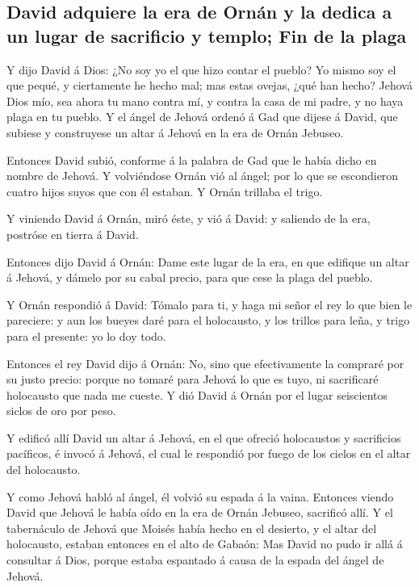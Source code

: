 \hypertarget{david-adquiere-la-era-de-ornuxe1n-y-la-dedica-a-un-lugar-de-sacrificio-y-templo-fin-de-la-plaga}{%
\subsection{David adquiere la era de Ornán y la dedica a un lugar de
sacrificio y templo; Fin de la
plaga}\label{david-adquiere-la-era-de-ornuxe1n-y-la-dedica-a-un-lugar-de-sacrificio-y-templo-fin-de-la-plaga}}

 Y dijo David á Dios: ¿No soy yo el que hizo contar el
pueblo? Yo mismo soy el que pequé, y ciertamente he hecho mal; mas estas
ovejas, ¿qué han hecho? Jehová Dios mío, sea ahora tu mano contra mí, y
contra la casa de mi padre, y no haya plaga en tu pueblo.
 Y el ángel de Jehová ordenó á Gad que dijese á David,
que subiese y construyese un altar á Jehová en la era de Ornán Jebuseo.

 Entonces David subió, conforme á la palabra de Gad que
le había dicho en nombre de Jehová.  Y volviéndose Ornán
vió al ángel; por lo que se escondieron cuatro hijos suyos que con él
estaban. Y Ornán trillaba el trigo.

 Y viniendo David á Ornán, miró éste, y vió á David: y
saliendo de la era, postróse en tierra á David.

 Entonces dijo David á Ornán: Dame este lugar de la era,
en que edifique un altar á Jehová, y dámelo por su cabal precio, para
que cese la plaga del pueblo.

 Y Ornán respondió á David: Tómalo para ti, y haga mi
señor el rey lo que bien le pareciere: y aun los bueyes daré para el
holocausto, y los trillos para leña, y trigo para el presente: yo lo doy
todo.

 Entonces el rey David dijo á Ornán: No, sino que
efectivamente la compraré por su justo precio: porque no tomaré para
Jehová lo que es tuyo, ni sacrificaré holocausto que nada me cueste.
 Y dió David á Ornán por el lugar seiscientos siclos de
oro por peso.

 Y edificó allí David un altar á Jehová, en el que
ofreció holocaustos y sacrificios pacíficos, é invocó á Jehová, el cual
le respondió por fuego de los cielos en el altar del holocausto.

 Y como Jehová habló al ángel, él volvió su espada á la
vaina.  Entonces viendo David que Jehová le había oído en
la era de Ornán Jebuseo, sacrificó allí.  Y el
tabernáculo de Jehová que Moisés había hecho en el desierto, y el altar
del holocausto, estaban entonces en el alto de Gabaón: Mas David no pudo
ir allá á consultar á Dios, porque estaba espantado á causa de la espada
del ángel de Jehová.


